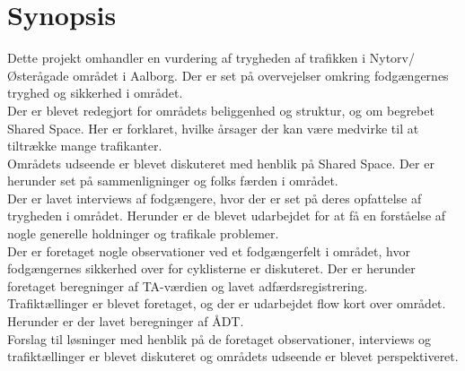 \section{Synopsis}
\label{sec:synopsis}

	


Dette projekt omhandler en vurdering af trygheden af trafikken i Nytorv/Østerågade området i Aalborg. Der er set på overvejelser omkring fodgængernes tryghed og sikkerhed i området.
\\
Der er blevet redegjort for områdets beliggenhed og struktur, og om begrebet Shared Space. Her er forklaret, hvilke årsager der kan være medvirke til at tiltrække mange trafikanter.
\\
Områdets udseende er blevet diskuteret med henblik på Shared Space. Der er herunder set på sammenligninger og folks færden i området.
\\
Der er lavet interviews af fodgængere, hvor der er set på deres opfattelse af trygheden i området. Herunder er de blevet udarbejdet for at få en forståelse af nogle generelle holdninger og trafikale problemer.
\\
Der er foretaget nogle observationer ved et fodgængerfelt i området, hvor fodgængernes sikkerhed over for cyklisterne er diskuteret. Der er herunder foretaget beregninger af TA-værdien og lavet adfærdsregistrering.
\\
Trafiktællinger er blevet foretaget, og der er udarbejdet flow kort over området. Herunder er der lavet beregninger af ÅDT.
\\
Forslag til løsninger med henblik på de foretaget observationer, interviews og trafiktællinger er blevet diskuteret og områdets udseende er blevet perspektiveret.
